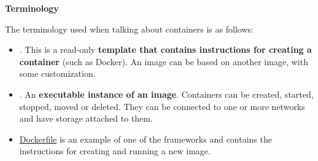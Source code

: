 \begin{flushleft}
    \textcolor{Green3}{ \textbf{Terminology}}
\end{flushleft}
The terminology used when talking about containers is as follows:
\begin{itemize}
    \item {}. This is a read-only \textbf{template that contains instructions for creating a container} (such as Docker). An image can be based on another image, with some customization.

    \item {}. An \textbf{executable instance of an image}. Containers can be created, started, stopped, moved or deleted. They can be connected to one or more networks and have storage attached to them.

    \item \href{https://docs.docker.com/get-started/02_our_app/}{Dockerfile} is an example of one of the frameworks and contains the instructions for creating and running a new image.
\end{itemize}